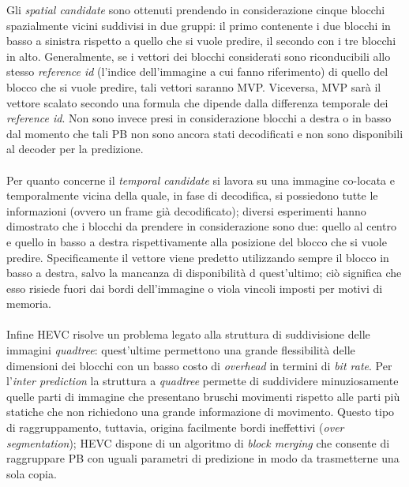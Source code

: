 Gli \emph{spatial candidate} sono ottenuti prendendo in considerazione cinque 
blocchi spazialmente vicini suddivisi in due gruppi: il primo contenente i 
due blocchi in basso a sinistra rispetto a quello che si vuole predire, il 
secondo con i tre blocchi in alto.
Generalmente, se i vettori dei blocchi considerati sono riconducibili allo 
stesso \emph{reference id} (l'indice dell'immagine a cui fanno 
riferimento) di quello del blocco che si vuole predire, tali vettori saranno 
MVP.
Viceversa, MVP sarà il vettore scalato secondo una formula che dipende dalla 
differenza temporale dei \emph{reference id}.
Non sono invece presi in considerazione blocchi a destra o in basso dal 
momento che tali PB non sono ancora stati decodificati e non sono disponibili 
al decoder per la predizione.
\\ \\
Per quanto concerne il \emph{temporal candidate} si lavora su una immagine 
co-locata e temporalmente vicina della quale, in fase di decodifica, si 
possiedono tutte le informazioni (ovvero un frame già decodificato); diversi 
esperimenti hanno dimostrato che i blocchi da prendere in considerazione sono 
due: quello al centro e quello in basso a destra rispettivamente alla posizione 
del blocco che si vuole predire.
Specificamente il vettore viene predetto utilizzando sempre il blocco in basso 
a destra, salvo la mancanza di disponibilità d quest'ultimo; ciò significa che 
esso risiede fuori dai bordi dell'immagine o viola vincoli imposti per motivi 
di memoria.
\\ \\
Infine HEVC risolve un problema legato alla struttura di suddivisione delle 
immagini \emph{quadtree}: quest'ultime permettono una grande flessibilità 
delle dimensioni dei blocchi con un basso costo di \emph{overhead} in termini 
di \emph{bit rate}. Per l'\emph{inter prediction} la struttura a \emph{quadtree}
 permette di suddividere minuziosamente quelle parti di immagine che presentano 
bruschi movimenti rispetto alle parti più statiche che non richiedono una 
grande informazione di movimento. Questo tipo di raggruppamento, tuttavia, 
origina facilmente bordi ineffettivi (\emph{over segmentation}); HEVC dispone 
di un  algoritmo di \emph{block merging} che consente di raggruppare PB con 
uguali parametri di predizione in modo da trasmetterne una sola copia.


